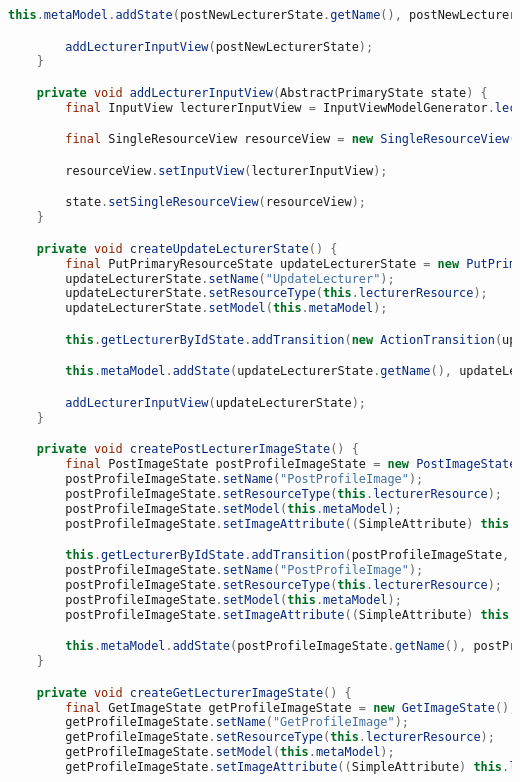 \begin{lstlisting}[label=lst:enfield_model,
language=java,
firstnumber=1,
caption=Beschreibung des \textit{Enfield-Modell} der Referenzimplementierung. ]
		this.metaModel.addState(postNewLecturerState.getName(), postNewLecturerState);

		addLecturerInputView(postNewLecturerState);
	}

	private void addLecturerInputView(AbstractPrimaryState state) {
		final InputView lecturerInputView = InputViewModelGenerator.lecturer();

		final SingleResourceView resourceView = new SingleResourceView();

		resourceView.setInputView(lecturerInputView);

		state.setSingleResourceView(resourceView);
	}

	private void createUpdateLecturerState() {
		final PutPrimaryResourceState updateLecturerState = new PutPrimaryResourceState();
		updateLecturerState.setName("UpdateLecturer");
		updateLecturerState.setResourceType(this.lecturerResource);
		updateLecturerState.setModel(this.metaModel);

		this.getLecturerByIdState.addTransition(new ActionTransition(updateLecturerState, "updateLecturer"));

		this.metaModel.addState(updateLecturerState.getName(), updateLecturerState);

		addLecturerInputView(updateLecturerState);
	}

	private void createPostLecturerImageState() {
		final PostImageState postProfileImageState = new PostImageState();
		postProfileImageState.setName("PostProfileImage");
		postProfileImageState.setResourceType(this.lecturerResource);
		postProfileImageState.setModel(this.metaModel);
		postProfileImageState.setImageAttribute((SimpleAttribute) this.lecturerResource.getAttributeByName("profileImageUrl"));

		this.getLecturerByIdState.addTransition(postProfileImageState, "postImage");
		postProfileImageState.setName("PostProfileImage");
		postProfileImageState.setResourceType(this.lecturerResource);
		postProfileImageState.setModel(this.metaModel);
		postProfileImageState.setImageAttribute((SimpleAttribute) this.lecturerResource.getAttributeByName("profileImageUrl"));

		this.metaModel.addState(postProfileImageState.getName(), postProfileImageState);
	}

	private void createGetLecturerImageState() {
		final GetImageState getProfileImageState = new GetImageState();
		getProfileImageState.setName("GetProfileImage");
		getProfileImageState.setResourceType(this.lecturerResource);
		getProfileImageState.setModel(this.metaModel);
		getProfileImageState.setImageAttribute((SimpleAttribute) this.lecturerResource.getAttributeByName("profileImageUrl"));


\end{lstlisting}
